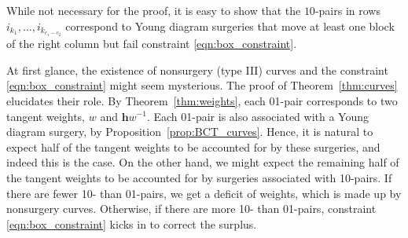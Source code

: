 \documentclass[pdftex]{sigma}
\numberwithin{equation}{section}
\newcommand{\hb}{\mathbf h}
\begin{document}
\begin{Remark}
While not necessary for the proof, it is easy to show that the $10$-pairs in rows $i_{k_1}, \dots , i_{k_{c_1 - c_2}}$ correspond to Young diagram surgeries that move at least one block of the right column but fail constraint \eqref{eqn:box_constraint}.
\end{Remark}

At first glance, the existence of nonsurgery (type III) curves and the constraint \eqref{eqn:box_constraint} might seem mysterious. The proof of Theorem~\ref{thm:curves} elucidates their role. By Theorem~\ref{thm:weights}, each 01-pair corresponds to two tangent weights, $w$ and $\hb w^{-1}$. Each 01-pair is also associated with a Young diagram surgery, by Proposition~\ref{prop:BCT_curves}. Hence, it is natural to expect half of the tangent weights to be accounted for by these surgeries, and indeed this is the case. On the other hand, we might expect the remaining half of the tangent weights to be accounted for by surgeries associated with 10-pairs. If there are fewer 10- than 01-pairs, we get a deficit of weights, which is made up by nonsurgery curves. Otherwise, if there are more 10- than 01-pairs, constraint \eqref{eqn:box_constraint} kicks in to correct the surplus.
\end{document}
